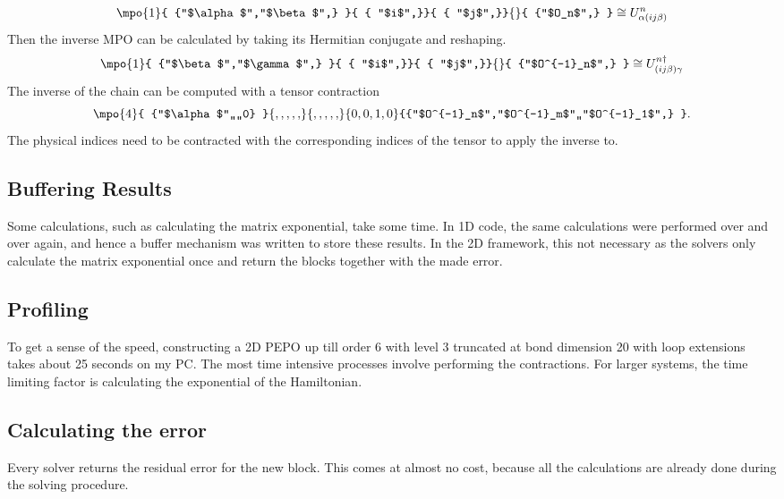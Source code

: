 \begin{equation}
    \mpo{1}{ {"$\alpha$","$\beta$",}  }{ { "$i$",}}{ { "$j$",}}{}{ {"$O_n$",} } \cong U^{n}_{\alpha (i j \beta)}
\end{equation}
Then the inverse \Gls{MPO} can be calculated by taking its Hermitian conjugate and reshaping.
\begin{equation}
    \mpo{1}{ {"$\beta$","$\gamma$",}  }{ { "$i$",}}{ { "$j$",}}{}{ {"$O^{-1}_n$",} } \cong U^{n \dagger}_{ (i j \beta)  \gamma }
\end{equation}
The inverse of the chain can be computed with a tensor contraction
\begin{equation}
    \mpo{4}{ {"$\alpha$",,,,0}  }{ {,,,,,}}{ { ,,,,,}}{{0,0,1,0}}{{"$O^{-1}_n$","$O^{-1}_m$",,"$O^{-1}_1$",} }.
\end{equation}
The physical indices need to be contracted with the corresponding indices of the tensor to apply the inverse to.

\subsection{Buffering Results}

Some calculations, such as calculating the matrix exponential, take some time. In 1D code, the same calculations were performed over and over again, and hence a buffer mechanism was written to store these results. In the 2D framework, this not necessary as the solvers only calculate the matrix exponential once and return the blocks together with the made error.

\subsection{Profiling}
To get a sense of the speed, constructing a 2D PEPO up till order 6 with level 3 truncated at bond dimension 20 with loop extensions takes about 25 seconds on my PC. The most time intensive processes involve performing the contractions. For larger systems, the time limiting factor is calculating the exponential of the Hamiltonian.

\subsection{Calculating the error}

Every solver returns the residual error for the new block. This comes at almost no cost, because all the calculations are already done during the solving procedure.

